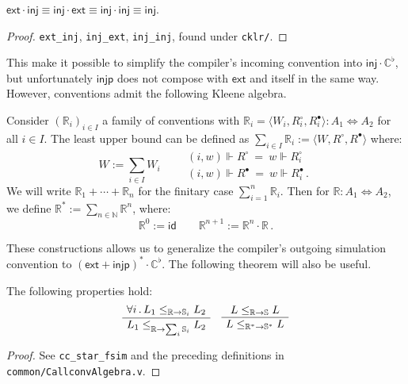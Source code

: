 \documentclass[sigplan,10pt,review,anonymous]{acmart}\settopmatter{printfolios=true,printccs=false,printacmref=false}
\newcommand{\kw}[1]{\ensuremath{ \mathsf{#1} }}
\newcommand{\que}{\circ}
\newcommand{\ans}{\bullet}
\begin{document}
\begin{theorem} \label{thm:extinj}
$
  \kw{ext} \cdot \kw{inj} \equiv
  \kw{inj} \cdot \kw{ext} \equiv
  \kw{inj} \cdot \kw{inj} \equiv
  \kw{inj}
$.
\begin{proof}
\texttt{ext\_inj}, \texttt{inj\_ext}, \texttt{inj\_inj},
found under \texttt{cklr/}.
\end{proof}
\end{theorem}

This make it possible to simplify
the compiler's incoming convention
into $\kw{inj} \cdot \mathbb{C}^\flat$,
but unfortunately \kw{injp}
does not compose with \kw{ext} and itself in the same way.
However, conventions
admit the following Kleene algebra.

\begin{definition} %
Consider $(\mathbb{R}_i)_{i \in I}$
a family of conventions
with
$\mathbb{R}_i = \langle W_i, R_i^\que, R_i^\ans \rangle
  : A_1 \Leftrightarrow A_2$
for all $i \in I$.
The least upper bound
can be defined as
$\sum_{i \in I} \mathbb{R}_i := \langle W, R^\que, R^\ans \rangle$
where:
\[
  W := \sum_{i \in I} W_i  \qquad
  \begin{array}{l}
  (i, w) \Vdash R^\que \: = \: w \Vdash R_i^\que \\[1ex]
  (i, w) \Vdash R^\ans \: = \: w \Vdash R_i^\ans \,.
  \end{array}
\]
We will write $\mathbb{R}_1 + \cdots + \mathbb{R}_n$
for the finitary case $\sum_{i=1}^n \mathbb{R}_i$.
Then for $\mathbb{R} : A_1 \Leftrightarrow A_2$,
we define
$\mathbb{R}^* := \sum_{n \in \mathbb{N}} \mathbb{R}^n$,
where:
\[
  \mathbb{R}^0 := \kw{id} \qquad
  \mathbb{R}^{n+1} := \mathbb{R}^n \cdot \mathbb{R} \,.
\]
\end{definition}

These constructions allows us to generalize the compiler's
outgoing simulation convention to
$(\kw{ext} + \kw{injp})^* \cdot \mathbb{C}^\flat$.
The following theorem will also be useful.

\begin{theorem} \label{thm:simk} %
The following properties hold:
\[
  \AxiomC{$\forall i \,.\,
    L_1 \le_{\mathbb{R} \rightarrow \mathbb{S}_i} L_2$}
  \UnaryInfC{$
    L_1 \le_{\mathbb{R} \rightarrow \sum_i \mathbb{S}_i} L_2$}
  \DisplayProof
  \quad
  \AxiomC{$L \le_{\mathbb{R} \rightarrow \mathbb{S}} L$}
  \UnaryInfC{$L \le_{\mathbb{R}^* \rightarrow \mathbb{S}^*} L$}
  \DisplayProof
\]
\begin{proof}
See \texttt{cc\_star\_fsim} and the preceding definitions
in \texttt{common/CallconvAlgebra.v}.
\end{proof}
\end{theorem}
\end{document}
